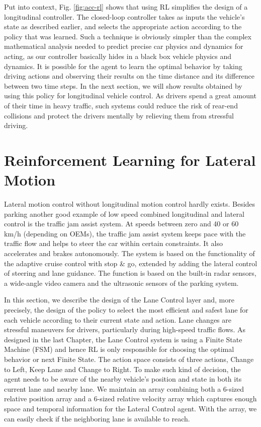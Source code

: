 Put into context, Fig. \ref{fig:acc-rl} shows that using RL simplifies the design of a longitudinal controller. The closed-loop controller takes as inputs the vehicle's state as described earlier, and selects the appropriate action according to the policy that was learned. Such a technique is obviously simpler than the complex mathematical analysis needed to predict precise car physics and dynamics for acting, as our controller basically hides in a black box vehicle physics and dynamics. It is possible for the agent to learn the optimal behavior by taking driving actions and observing their results on the time distance and its difference between two time steps. In the next section, we will show results obtained by using this policy for longitudinal vehicle control. As drivers spend a great amount of their time in heavy traffic, such systems could reduce the risk of rear-end collisions and protect the drivers mentally by relieving them from stressful driving.

\section{Reinforcement Learning for Lateral Motion}

Lateral motion control without longitudinal motion control hardly exists. Besides parking another good example of low speed combined longitudinal and lateral control is the traffic jam assist system. At speeds between zero and 40 or 60 km/h (depending on OEMs), the traffic jam assist system keeps pace with the traffic flow and helps to steer the car within certain constraints. It also accelerates and brakes autonomously. The system is based on the functionality of the adaptive cruise control with stop \& go, extended by adding the lateral control of steering and lane guidance. The function is based on the built-in radar sensors, a wide-angle video camera and the ultrasonic sensors of the parking system.

In this section, we describe the design of the Lane Control layer and, more precisely, the design of the policy to select the most efficient and safest lane for each vehicle according to their current state and action. Lane changes are stressful maneuvers for drivers, particularly during high-speed traffic flows. As designed in the last Chapter, the Lane Control system is using a Finite State Machine (FSM) and hence RL is only responsible for choosing the optimal behavior or next Finite State. The action space consists of three actions, Change to Left, Keep Lane and Change to Right. To make such kind of decision, the agent needs to be aware of the nearby vehicle's position and state in both its current lane and nearby lane. We maintain an array combining both a 6-sized relative position array and a 6-sized relative velocity array which captures enough space and temporal information for the Lateral Control agent. With the array, we can easily check if the neighboring lane is available to reach.

